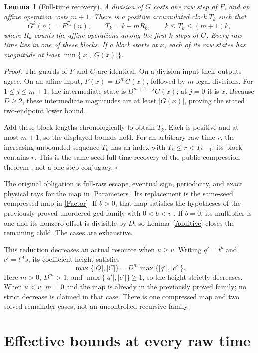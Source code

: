 \documentclass[11pt,letterpaper]{article}
\newtheorem{lemma}[theorem]{Lemma}
\newenvironment{proof}{\noindent\textit{Proof.}}{\hfill\(\square\)}
\begin{document}
\begin{lemma}[Full-time recovery]\label{Compression}
A division of \(G\) costs one raw step of \(F\), and an affine operation
costs \(m+1\). There is a positive accumulated clock \(T_k\) such that
\[
G^k(n)=F^{T_k}(n),\qquad
T_k=k+mR_k,\qquad k\le T_k\le(m+1)k,
\]
where \(R_k\) counts the affine operations among the first \(k\) steps of \(G\).
Every raw time lies in one of these blocks. If a block starts at \(x\),
each of its raw states has magnitude at least
\(\min\{|x|,|G(x)|\}\).
\end{lemma}
\begin{proof}
The guards of \(F\) and \(G\) are identical. On a division input their
outputs agree. On an affine input, \(F(x)=D^mG(x)\), followed by \(m\)
legal divisions. For \(1\le j\le m+1\), the intermediate state is
\(D^{m+1-j}G(x)\); at \(j=0\) it is \(x\).
Because \(D\ge2\), these intermediate magnitudes are at least
\(|G(x)|\), proving the stated two-endpoint lower bound.

Add these block lengths chronologically to obtain \(T_k\). Each is
positive and at most \(m+1\), so the displayed bounds hold.
For an arbitrary raw time \(r\), the increasing unbounded sequence \(T_k\)
has an index with \(T_k\le r<T_{k+1}\); its block contains \(r\).
This is the same-seed full-time recovery of the public compression theorem
\cite{AscendCompressionII}, not a one-step conjugacy.
\end{proof}

The original obligation is full-raw escape, eventual sign, periodicity,
and exact physical rays for the map in \eqref{Parameters}. Its replacement
is the same-seed compressed map in \eqref{Factor}. If \(b>0\), that map
satisfies the hypotheses of the previously proved unordered-gcd family
with \(0<b<v\) \cite{AscendRebasing}. If \(b=0\), its multiplier is one
and its nonzero offset is divisible by \(D\), so Lemma~\ref{Additive}
closes the remaining child. The cases are exhaustive.

This reduction decreases an actual resource when \(u\ge v\).
Writing \(q'=t^b\) and \(c'=t^A s\), its coefficient height satisfies
\[
\max\{|Q|,|C|\}=D^m\max\{|q'|,|c'|\}.
\]
Here \(m>0\), \(D^m>1\), and \(\max\{|q'|,|c'|\}\ge1\), so the height
strictly decreases. When \(u<v\), \(m=0\) and the map is already in the
previously proved family; no strict decrease is claimed in that case.
There is one compressed map and two solved remainder cases, not an
uncontrolled recursive family.

\section{Effective bounds at every raw time}
\end{document}
